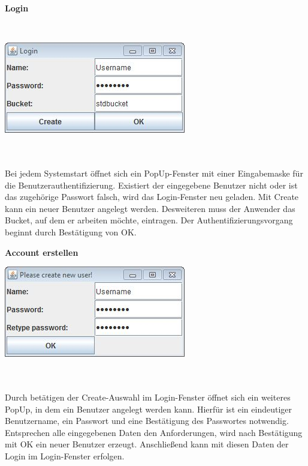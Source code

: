 \documentclass[12pt,a4paper,bibliography=totocnumbered,listof=totocnumbered]{scrartcl}
\begin{document}
\textbf{Login}

\vspace{1em}
$\;$\\
\begin{minipage}{\linewidth}
	\centering
	\includegraphics[width=0.4\linewidth]{./img/Login.jpg}
	\label{Login}
\end{minipage}
\\\\Bei jedem Systemstart öffnet sich ein PopUp-Fenster mit einer Eingabemaske für die Benutzerauthentifizierung. Existiert der eingegebene Benutzer nicht oder ist das zugehörige Passwort falsch, wird das Login-Fenster neu geladen. Mit Create kann ein neuer Benutzer angelegt werden. Desweiteren muss der Anwender das Bucket, auf dem er arbeiten möchte, eintragen. Der Authentifizierungsvorgang beginnt durch Bestätigung von OK.

\textbf{Account erstellen}
\vspace{1em}
$\;$\\
\begin{minipage}{\linewidth}
	\centering
	\includegraphics[width=0.4\linewidth]{./img/Create.jpg}
	\label{Create}
\end{minipage}
\\\\Durch betätigen der Create-Auswahl im Login-Fenster öffnet sich ein weiteres PopUp, in dem ein Benutzer angelegt werden kann. Hierfür ist ein eindeutiger Benutzername, ein Passwort und eine Bestätigung des Passwortes notwendig. Entsprechen alle eingegebenen Daten den Anforderungen, wird nach Bestätigung mit OK ein neuer Benutzer erzeugt. Anschließend kann mit diesen Daten der Login im Login-Fenster erfolgen.
\end{document}

